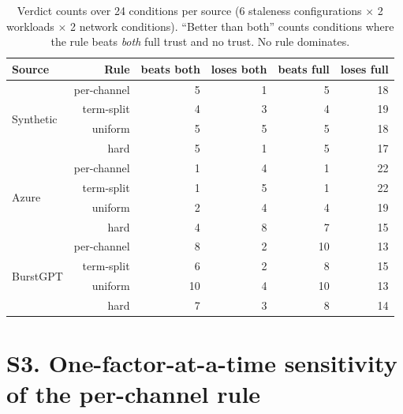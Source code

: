 \documentclass[11pt,a4paper]{article}
\begin{document}
\begin{table}[h]
\centering
\caption{Verdict counts over 24 conditions per source (6 staleness configurations $\times$ 2
workloads $\times$ 2 network conditions). “Better than both” counts conditions where the rule
beats \emph{both} full trust and no trust. No rule dominates.}
\small
\setlength{\tabcolsep}{6pt}
\begin{tabular}{@{}lrrrrr@{}}
\toprule
Source & Rule & beats both & loses both & beats full & loses full \\
\midrule
\multirow{4}{*}{Synthetic} & per-channel & 5 & 1 & 5 & 18 \\
                           & term-split  & 4 & 3 & 4 & 19 \\
                           & uniform     & 5 & 5 & 5 & 18 \\
                           & hard        & 5 & 1 & 5 & 17 \\
\midrule
\multirow{4}{*}{Azure}     & per-channel & 1 & 4 & 1 & 22 \\
                           & term-split  & 1 & 5 & 1 & 22 \\
                           & uniform     & 2 & 4 & 4 & 19 \\
                           & hard        & 4 & 8 & 7 & 15 \\
\midrule
\multirow{4}{*}{BurstGPT}  & per-channel & 8 & 2 & 10 & 13 \\
                           & term-split  & 6 & 2 & 8 & 15 \\
                           & uniform     & 10 & 4 & 10 & 13 \\
                           & hard        & 7 & 3 & 8 & 14 \\
\bottomrule
\end{tabular}
\end{table}

\section*{S3. One-factor-at-a-time sensitivity of the per-channel rule}
\end{document}
